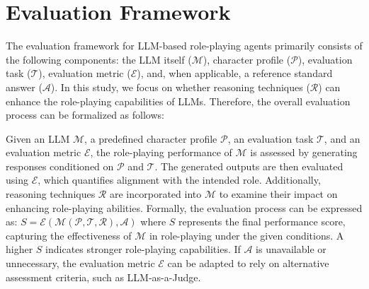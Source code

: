 \section{Evaluation Framework}
The evaluation framework for LLM-based role-playing agents primarily consists of the following components: the LLM itself (\(\mathcal{M}\)), character profile (\(\mathcal{P}\)), evaluation task (\(\mathcal{T}\)), evaluation metric (\(\mathcal{E}\)), and, when applicable, a reference standard answer (\(\mathcal{A}\)).
In this study, we focus on whether reasoning techniques (\(\mathcal{R}\)) can enhance the role-playing capabilities of LLMs. 
Therefore, the overall evaluation process can be formalized as follows:

Given an LLM \(\mathcal{M}\), a predefined character profile \(\mathcal{P}\), an evaluation task \(\mathcal{T}\), and an evaluation metric \(\mathcal{E}\), the role-playing performance of \(\mathcal{M}\) is assessed by generating responses conditioned on \(\mathcal{P}\) and \(\mathcal{T}\). The generated outputs are then evaluated using \(\mathcal{E}\), which quantifies alignment with the intended role. 
Additionally, reasoning techniques \(\mathcal{R}\) are incorporated into \(\mathcal{M}\) to examine their impact on enhancing role-playing abilities.
Formally, the evaluation process can be expressed as:
$S = \mathcal{E}(\mathcal{M}(\mathcal{P}, \mathcal{T}, \mathcal{R}), \mathcal{A})$
where \( S \) represents the final performance score, capturing the effectiveness of \(\mathcal{M}\) in role-playing under the given conditions. 
A higher \( S \) indicates stronger role-playing capabilities.
If \(\mathcal{A}\) is unavailable or unnecessary, the evaluation metric \(\mathcal{E}\) can be adapted to rely on alternative assessment criteria, such as LLM-as-a-Judge.
